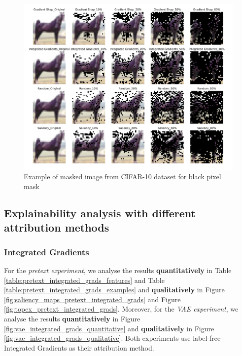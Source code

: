 \begin{figure}[H]
    \centering
    \includegraphics[width=12cm]{images/black horse.png}
    \caption{Example of masked image from CIFAR-10 dataset for black pixel mask}
    \label{fig:black_horse}
\end{figure}

\subsection{Explainability analysis with different attribution methods}
\label{appendix:explainability_attr_methods}

\subsubsection{Integrated Gradients}

For the \textit{pretext experiment}, we analyse the results \textbf{quantitatively} in Table \ref{table:pretext_integrated_grads_features} and Table \ref{table:pretext_integrated_grads_examples} and \textbf{qualitatively} in Figure \ref{fig:saliency_maps_pretext_integrated_grads} and Figure \ref{fig:topex_pretext_integrated_grads}. Moreover, for the \textit{VAE experiment}, we analyse the results \textbf{quantitatively} in Figure \ref{fig:vae_integrated_grads_quantitative} and \textbf{qualitatively} in Figure \ref{fig:vae_integrated_grads_qualitative}. Both experiments use label-free Integrated Gradients as their attribution method.

